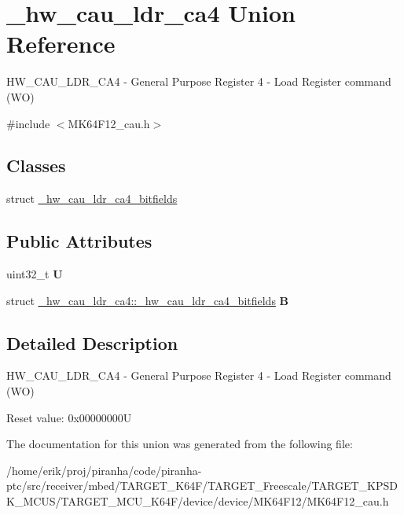 \hypertarget{union__hw__cau__ldr__ca4}{}\section{\+\_\+hw\+\_\+cau\+\_\+ldr\+\_\+ca4 Union Reference}
\label{union__hw__cau__ldr__ca4}


H\+W\+\_\+\+C\+A\+U\+\_\+\+L\+D\+R\+\_\+\+C\+A4 -\/ General Purpose Register 4 -\/ Load Register command (WO)  




{\ttfamily \#include $<$M\+K64\+F12\+\_\+cau.\+h$>$}

\subsection*{Classes}
\begin{DoxyCompactItemize}
\item 
struct \hyperlink{struct__hw__cau__ldr__ca4_1_1__hw__cau__ldr__ca4__bitfields}{\+\_\+hw\+\_\+cau\+\_\+ldr\+\_\+ca4\+\_\+bitfields}
\end{DoxyCompactItemize}
\subsection*{Public Attributes}
\begin{DoxyCompactItemize}
\item 
uint32\+\_\+t {\bfseries U}\hypertarget{union__hw__cau__ldr__ca4_a1faad8cdb9bbb4ce06362e88d5ab4fda}{}\label{union__hw__cau__ldr__ca4_a1faad8cdb9bbb4ce06362e88d5ab4fda}

\item 
struct \hyperlink{struct__hw__cau__ldr__ca4_1_1__hw__cau__ldr__ca4__bitfields}{\+\_\+hw\+\_\+cau\+\_\+ldr\+\_\+ca4\+::\+\_\+hw\+\_\+cau\+\_\+ldr\+\_\+ca4\+\_\+bitfields} {\bfseries B}\hypertarget{union__hw__cau__ldr__ca4_a1dc53c1a27e985585ac9f0c2c0f2eb60}{}\label{union__hw__cau__ldr__ca4_a1dc53c1a27e985585ac9f0c2c0f2eb60}

\end{DoxyCompactItemize}


\subsection{Detailed Description}
H\+W\+\_\+\+C\+A\+U\+\_\+\+L\+D\+R\+\_\+\+C\+A4 -\/ General Purpose Register 4 -\/ Load Register command (WO) 

Reset value\+: 0x00000000U 

The documentation for this union was generated from the following file\+:\begin{DoxyCompactItemize}
\item 
/home/erik/proj/piranha/code/piranha-\/ptc/src/receiver/mbed/\+T\+A\+R\+G\+E\+T\+\_\+\+K64\+F/\+T\+A\+R\+G\+E\+T\+\_\+\+Freescale/\+T\+A\+R\+G\+E\+T\+\_\+\+K\+P\+S\+D\+K\+\_\+\+M\+C\+U\+S/\+T\+A\+R\+G\+E\+T\+\_\+\+M\+C\+U\+\_\+\+K64\+F/device/device/\+M\+K64\+F12/M\+K64\+F12\+\_\+cau.\+h\end{DoxyCompactItemize}
